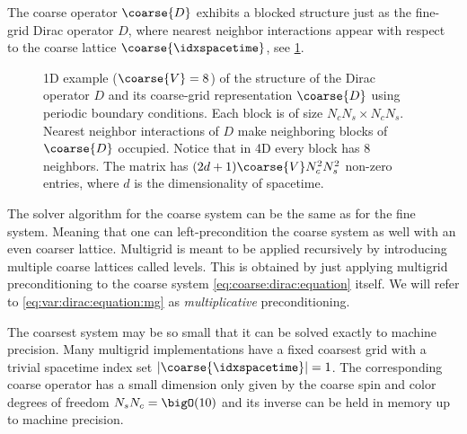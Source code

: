 The coarse operator $\coarse{D}$ exhibits a blocked structure just as the fine-grid Dirac operator $D$, where nearest neighbor interactions appear with respect to the coarse lattice $\coarse{\idxspacetime}$, see \cref{fig:coarse:op:structure}.
\begin{figure}
\centering

\caption{
1D example ($\coarse{V} = 8$) of the structure of the Dirac operator $D$ and its coarse-grid representation $\coarse{D}$ using periodic boundary conditions.
Each block is of size $N_c N_s \times N_c N_s$.
Nearest neighbor interactions of $D$ make neighboring blocks of $\coarse{D}$ occupied.
Notice that in 4D every block has \num{8} neighbors.
The matrix has $(2d+1)\coarse{V} N_c^2 N_s^2$ non-zero entries, where $d$ is the dimensionality of spacetime.
\takenfull
}
\label{fig:coarse:op:structure}
\end{figure}
The solver algorithm for the coarse system can be the same as for the fine system.
Meaning that one can left-precondition the coarse system as well with an even coarser lattice.
Multigrid is meant to be applied recursively by introducing multiple coarse lattices called levels.
This is obtained by just applying multigrid preconditioning to the coarse system \cref{eq:coarse:dirac:equation} itself.
We will refer to \cref{eq:var:dirac:equation:mg} as \emph{multiplicative} preconditioning.

The coarsest system may be so small that it can be solved exactly to machine precision.
Many multigrid implementations have a fixed coarsest grid with a trivial spacetime index set $\lvert \coarse{\idxspacetime} \rvert = 1$.
The corresponding coarse operator has a small dimension only given by the coarse spin and color degrees of freedom $N_s N_c = \bigO(10)$ and its inverse can be held in memory up to machine precision.

